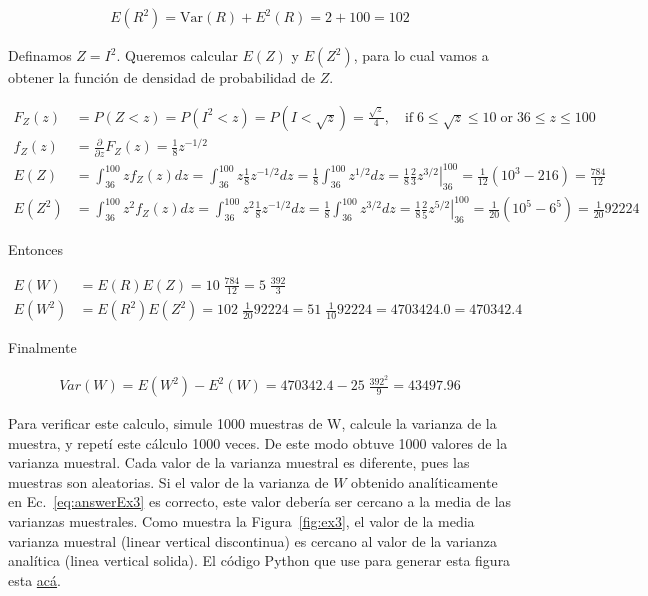 \documentclass[10pt]{article}
\begin{document}
\begin{align*}
    E(R^2)=\text{Var}(R)+E^2(R)=2+100=102
\end{align*}

Definamos $Z=I^2$. Queremos calcular $E(Z)$ y $E(Z^2)$, para lo cual vamos a
obtener la función de densidad de probabilidad de $Z$.

\begin{align}
    F_Z(z)&=P(Z<z)=P(I^2<z)=P(I<\sqrt{z})=\frac{\sqrt{z}}{4},\quad\text{if}\;6\le\sqrt{z}\le
    10\;\text{or}\;36\le z\le 100\nonumber\\
    f_Z(z)&=\frac{\partial}{\partial z}F_Z(z)=\frac{1}{8}z^{-1/2}\nonumber\\
    E(Z)&=\int_{36}^{100}zf_Z(z)dz=\int_{36}^{100}z\frac{1}{8}z^{-1/2}dz=\frac{1}{8}\int_{36}^{100}z^{1/2}dz=\frac{1}{8}\frac{2}{3}\left.z^{3/2}\right|_{36}^{100}=\frac{1}{12}(10^3-216)=\frac{784}{12}\label{eq:EZ}\\
    E(Z^2)&=\int_{36}^{100}z^2f_Z(z)dz=\int_{36}^{100}z^2\frac{1}{8}z^{-1/2}dz=\frac{1}{8}\int_{36}^{100}z^{3/2}dz=\frac{1}{8}\frac{2}{5}\left.z^{5/2}\right|_{36}^{100}=\frac{1}{20}(10^5-6^5)=\frac{1}{20}92224\label{eq:EZ2}
\end{align}

Entonces

\begin{align*}
    E(W)&=E(R)E(Z)=10\;\frac{784}{12}=5\;\frac{392}{3}\\
    E(W^2)&=E(R^2)E(Z^2)=102\;\frac{1}{20}92224=51\;\frac{1}{10}92224=4703424.0=470342.4
\end{align*}

Finalmente

\begin{align}
    Var(W)=E(W^2)-E^2(W)=470342.4-25\;\frac{392^2}{9}=43497.96
    \label{eq:answerEx3}
\end{align}

Para verificar este calculo, simule 1000 muestras de W, calcule la
varianza de la muestra, y repetí este cálculo 1000 veces. De este modo obtuve 1000
valores de la varianza muestral. Cada valor de la varianza muestral es
diferente, pues las muestras son aleatorias. Si el valor de la varianza de $W$
obtenido analíticamente en Ec.~\ref{eq:answerEx3} es correcto, este valor
debería ser cercano a la media de las varianzas muestrales. Como muestra la
Figura~\ref{fig:ex3}, el valor de la media varianza muestral (linear vertical
discontinua) es cercano al valor de la varianza analítica (linea vertical
solida). El código Python que use para generar esta figura esta
\href{http://www.gatsby.ucl.ac.uk/~rapela/tmp/doEx3.py}{acá}.
\end{document}
